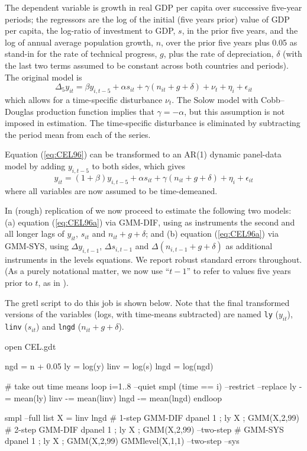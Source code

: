 The dependent variable is growth in real GDP per capita over
successive five-year periods; the regressors are the log of the
initial (five years prior) value of GDP per capita, the log-ratio of
investment to GDP, $s$, in the prior five years, and the log of annual
average population growth, $n$, over the prior five years plus 0.05 as
stand-in for the rate of technical progress, $g$, plus the rate of
depreciation, $\delta$ (with the last two terms assumed to be constant
across both countries and periods).  The original model is
\begin{equation}
\label{eq:CEL96}
\Delta_5 y_{it} = \beta y_{i,t-5} + \alpha s_{it} + \gamma (n_{it} +
g + \delta) + \nu_t + \eta_i + \epsilon_{it}
\end{equation}
which allows for a time-specific disturbance $\nu_t$. The Solow model
with Cobb--Douglas production function implies that $\gamma =
-\alpha$, but this assumption is not imposed in estimation. The
time-specific disturbance is eliminated by subtracting the period mean
from each of the series.

Equation (\ref{eq:CEL96}) can be transformed to an AR(1) dynamic
panel-data model by adding $y_{i,t-5}$ to both sides, which gives
\begin{equation}
\label{eq:CEL96a}
y_{it} = (1 + \beta) y_{i,t-5} + \alpha s_{it} + \gamma (n_{it} +
g + \delta) + \eta_i + \epsilon_{it}
\end{equation}
where all variables are now assumed to be time-demeaned.

In (rough) replication of \cite{Bond2001} we now proceed to estimate
the following two models: (a) equation (\ref{eq:CEL96a}) via GMM-DIF,
using as instruments the second and all longer lags of $y_{it}$,
$s_{it}$ and $n_{it} + g + \delta$; and (b) equation
(\ref{eq:CEL96a}) via GMM-SYS, using $\Delta y_{i,t-1}$, $\Delta
s_{i,t-1}$ and $\Delta (n_{i,t-1} + g + \delta)$ as additional
instruments in the levels equations. We report robust standard errors
throughout. (As a purely notational matter, we now use ``$t-1$'' to
refer to values five years prior to $t$, as in \cite{Bond2001}).

The gretl script to do this job is shown below. Note that the final
transformed versions of the variables (logs, with time-means
subtracted) are named \texttt{ly} ($y_{it}$), \texttt{linv} ($s_{it}$)
and \texttt{lngd} ($n_{it} + g + \delta$).
%
\begin{code}
open CEL.gdt

ngd = n + 0.05
ly = log(y)
linv = log(s)
lngd = log(ngd)

# take out time means
loop i=1..8 --quiet
  smpl (time == i) --restrict --replace
  ly -= mean(ly)
  linv -= mean(linv)
  lngd -= mean(lngd)
endloop

smpl --full
list X = linv lngd
# 1-step GMM-DIF
dpanel 1 ; ly X ; GMM(X,2,99)
# 2-step GMM-DIF
dpanel 1 ; ly X ; GMM(X,2,99) --two-step
# GMM-SYS
dpanel 1 ; ly X ; GMM(X,2,99) GMMlevel(X,1,1) --two-step --sys
\end{code}


